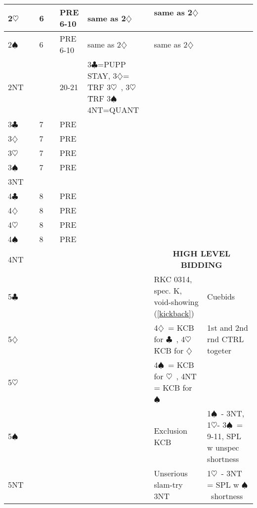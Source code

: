\documentclass{article}
\newcommand\C{\ensuremath{\clubsuit}}
\newcommand\D{\ensuremath{\diamondsuit}}
\renewcommand\H{\ensuremath{\heartsuit}}
\renewcommand\S{\ensuremath{\spadesuit}}
\newcommand\N{{\footnotesize NT}}
\begin{document}
\begin{tabular}{| p{9mm} | p{6mm} | p{9mm} | p{9mm} | p{30mm} | p{80mm} | p{62mm} | p{46mm} |}
	2\H & &6 & &PRE 6-10 &same as 2\D\ &same as 2\D\ & \\ \hline
	2\S & &6 & &PRE 6-10 &same as 2\D\ &same as 2\D\ & \\ \hline
	2\N & & & &20-21 & 3\C =PUPP STAY, 3\D= TRF 3\H\ , 3\H\= TRF 3\S\, 4NT=QUANT & & \\ \hline
	3\C & &7 & &PRE & & & \\ \hline
	3\D & &7 & &PRE & & & \\ \hline
	3\H & &7 & &PRE & & & \\ \hline
	3\S & &7 & &PRE & & & \\ \hline
	3\N & & & & & & & \\ \hline
	4\C & &8 & &PRE & & & \\ \hline
	4\D & &8 & &PRE & & & \\ \hline
	4\H & &8 & &PRE & & & \\ \hline
	4\S & &8 & &PRE & & & \\ \hline
        4\N & & & & & &\multicolumn{2}{c}{\cellcolor[gray]{0.9} \textbf{HIGH LEVEL BIDDING}} \\ \hline
        5\C & & & & & &RKC 0314, spec. K, void-showing (\ref{kickback})   & Cuebids\\ \hline
	5\D & & & & & & 4\D\ = KCB for \C\ , 4\H\= KCB for \D\  & 1st and 2nd rnd CTRL togeter \\ \hline
	5\H & & & & & &4\S\ = KCB for \H\ , 4NT = KCB for \S\  & \\ \hline
	5\S & & & & & &Exclusion KCB  & 1\S\ - 3NT, 1\H - 3\S\  = 9-11, SPL w unspec shortness \\ \hline
	5\N & & & & & &Unserious slam-try 3NT & 1\H\ - 3NT = SPL w \S\ shortness\\ \hline
\end{tabular}

\noindent
\end{document}
